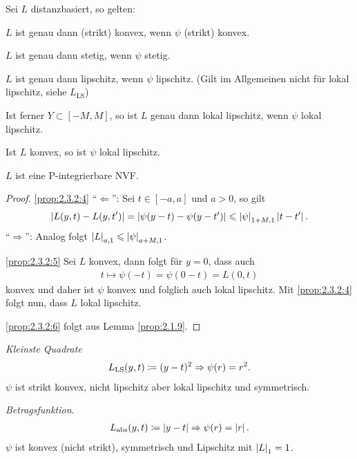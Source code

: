 \begin{lem}
\label{prop:2.3.2}
Sei $L$ distanzbasiert, so gelten:
\begin{propenum}
\item $L$ ist genau dann (strikt) konvex, wenn $\psi$ (strikt) konvex.
\item $L$ ist genau dann stetig, wenn $\psi$ stetig.
\item $L$ ist genau dann lipschitz, wenn $\psi$ lipschitz. (Gilt im Allgemeinen
nicht für lokal lipschitz, siehe $L_\mathrm{LS}$)\\
\item\label{prop:2.3.2:4} Ist ferner $Y\subset[-M,M]$, so ist $L$ genau
dann lokal lipschitz, wenn $\psi$ lokal lipschitz.
\item\label{prop:2.3.2:5} Ist $L$ konvex, so ist $\psi$ lokal lipschitz.
\item\label{prop:2.3.2:6} $L$ ist eine P-integrierbare NVF.\fishhere 
\end{propenum}
\end{lem}
\begin{proof}
\ref{prop:2.3.2:4} "`$\Leftarrow$"': Sei $t\in[-a,a]$ und $a > 0$, so gilt
\begin{align*}
\left|L(y,t)-L(y,t')\right| = \left|\psi(y-t)-\psi(y-t')\right| \leqslant
\left|\psi\right|_{1+M,1}\left|t-t'\right|.
\end{align*}
"`$\Rightarrow$"': Analog folgt $\left|L\right|_{a,1} \leqslant \left|\psi\right|_{a+M,1}$.

\ref{prop:2.3.2:5} Sei $L$ konvex, dann folgt für $y=0$, dass auch
\begin{align*}
t\mapsto \psi(-t) = \psi(0-t) = L(0,t)
\end{align*}
konvex und daher ist $\psi$ konvex und folglich auch lokal lipschitz. Mit
\ref{prop:2.3.2:4} folgt nun, dass $L$ lokal lipschitz.

\ref{prop:2.3.2:6} folgt aus Lemma \ref{prop:2.1.9}.\qedhere
\end{proof}

\begin{bsp}
\label{bsp:2.3.3}
\textit{Kleinste Quadrate}
\begin{align*}
L_{\mathrm{LS}}(y,t) \coloneq (y-t)^2 \Rightarrow \psi(r) = r^2.
\end{align*}
$\psi$ ist strikt konvex, nicht lipschitz aber lokal lipschitz und
symmetrisch.\bsphere
\end{bsp}

\begin{bsp}
\label{bsp:2.3.4}
\textit{Betragsfunktion}.
\begin{align*}
L_{\mathrm{abs}}(y,t) \coloneq \left|y-t\right| \Rightarrow \psi(r) = \left|r\right|.
\end{align*}
$\psi$ ist konvex (nicht strikt), symmetrisch und Lipschitz mit $\left|L\right|_1 = 1$.
\end{bsp}


